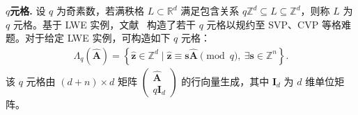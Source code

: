 \documentclass[12pt,a4paper]{article}
\numberwithin{equation}{section}
\begin{document}
\textbf{$q$元格.}
设 $q$ 为奇素数，若满秩格 $L \subset \mathbb{R}^d$ 满足包含关系 $q \mathbb{Z}^d \subseteq L \subseteq \mathbb{Z}^d$，则称 $L$ 为 $q$ 元格。基于 LWE 实例，文献~\cite{micciancioLatticebasedCryptography2009} 构造了若干 $q$ 元格以规约至 SVP、CVP 等格难题。对于给定 LWE 实例，可构造如下 $q$ 元格：
\begin{align}
    \Lambda_q(\mathbf{\hat{A}}) = \left\{ \mathbf{\hat{z}} \in \mathbb{Z}^d \mid \mathbf{\hat{z}} \equiv \mathbf{s}\mathbf{\hat{A}} \pmod{q},\ \exists \mathbf{s} \in \mathbb{Z}^n \right\}.
\end{align}
该 $q$ 元格由 $(d+n)\times d$ 矩阵 $\begin{pmatrix} \mathbf{\hat{A}} \\ q\mathbf{I}_d \end{pmatrix}$ 的行向量生成，其中 $\mathbf{I}_d$ 为 $d$ 维单位矩阵。











\end{document}
